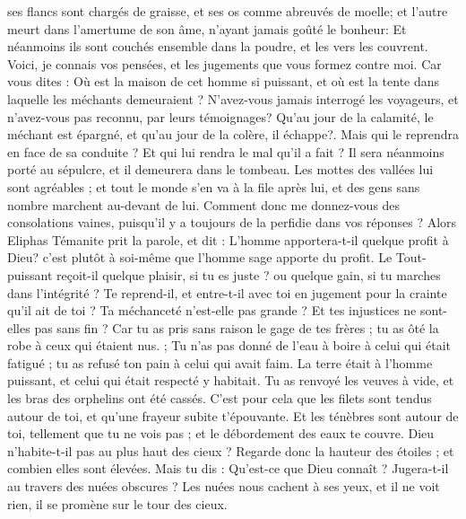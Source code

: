 \begin{multicols}{2}
ses flancs sont chargés de graisse, et ses os comme abreuvés de moelle; 
et l'autre meurt dans l'amertume de son âme, n'ayant jamais goûté le bonheur: 
Et néanmoins ils sont couchés ensemble dans la poudre, et les vers les couvrent. 
Voici, je connais vos pensées, et les jugements que vous formez contre moi. 
Car vous dites : Où est la maison de cet homme si puissant, et où est la tente dans laquelle les méchants demeuraient ? 
N'avez-vous jamais interrogé les voyageurs, et n'avez-vous pas reconnu, par leurs témoignages?
Qu'au jour de la calamité, le méchant est épargné, et qu'au jour de la colère, il échappe?.
Mais qui le reprendra en face de sa conduite ? Et qui lui rendra le mal qu'il a fait ?
Il sera néanmoins porté au sépulcre, et il demeurera dans le tombeau.
Les mottes des vallées lui sont agréables ; et tout le monde s'en va à la file après lui, et des gens sans nombre marchent au-devant de lui. 
Comment donc me donnez-vous des consolations vaines, puisqu'il y a toujours de la perfidie dans vos réponses ? 
\VerseOne{}Alors Eliphas Témanite prit la parole, et dit : 
L'homme apportera-t-il quelque profit à Dieu? c'est plutôt à soi-même que l'homme sage apporte du profit. 
Le Tout-puissant reçoit-il quelque plaisir, si tu es juste ? ou quelque gain, si tu marches dans l'intégrité ?
Te reprend-il, et entre-t-il avec toi en jugement pour la crainte qu'il ait de toi ? 
Ta méchanceté n'est-elle pas grande ? Et tes injustices ne sont-elles pas sans fin ? 
Car tu as pris sans raison le gage de tes frères ; tu as ôté la robe à ceux qui étaient nus. ;
Tu n'as pas donné de l'eau à boire à celui qui était fatigué ; tu as refusé ton pain à celui qui avait faim.
La terre était à l'homme puissant, et celui qui était respecté y habitait. 
Tu as renvoyé les veuves à vide, et les bras des orphelins ont été cassés.
C'est pour cela que les filets sont tendus autour de toi, et qu'une frayeur subite t'épouvante. 
Et les ténèbres sont autour de toi, tellement que tu ne vois pas ; et le débordement des eaux te couvre.
Dieu n'habite-t-il pas au plus haut des cieux ? Regarde donc la hauteur des étoiles ; et combien elles sont élevées.
Mais tu dis : Qu'est-ce que Dieu connaît ? Jugera-t-il au travers des nuées obscures ? 
Les nuées nous cachent à ses yeux, et il ne voit rien, il se promène sur le tour des cieux. 

\end{multicols}
